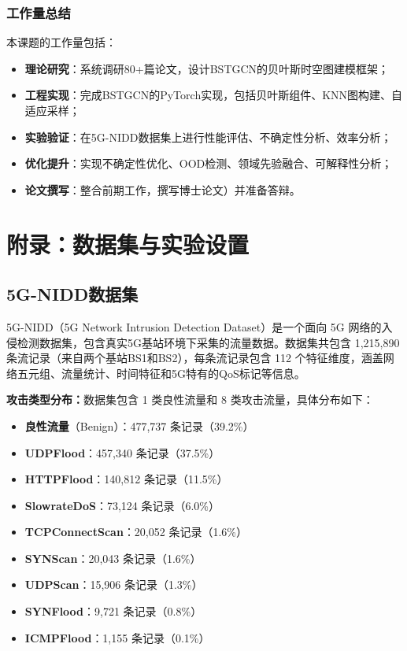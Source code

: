 \subsubsection{工作量总结}

本课题的工作量包括：

\begin{itemize}
  \item \textbf{理论研究}：系统调研80+篇论文，设计BSTGCN的贝叶斯时空图建模框架；
  \item \textbf{工程实现}：完成BSTGCN的PyTorch实现，包括贝叶斯组件、KNN图构建、自适应采样；
  \item \textbf{实验验证}：在5G-NIDD数据集上进行性能评估、不确定性分析、效率分析；
  \item \textbf{优化提升}：实现不确定性优化、OOD检测、领域先验融合、可解释性分析；
  \item \textbf{论文撰写}：整合前期工作，撰写博士论文）并准备答辩。
\end{itemize}


\section{附录：数据集与实验设置}

\subsection{5G-NIDD数据集}

5G-NIDD（5G Network Intrusion Detection Dataset）是一个面向 5G 网络的入侵检测数据集，包含真实5G基站环境下采集的流量数据。数据集共包含 1,215,890 条流记录（来自两个基站BS1和BS2），每条流记录包含 112 个特征维度，涵盖网络五元组、流量统计、时间特征和5G特有的QoS标记等信息。

\textbf{攻击类型分布：}数据集包含 1 类良性流量和 8 类攻击流量，具体分布如下：

\begin{itemize}
  \item \textbf{良性流量}（Benign）：477,737 条记录（39.2\%）
  \item \textbf{UDPFlood}：457,340 条记录（37.5\%）
  \item \textbf{HTTPFlood}：140,812 条记录（11.5\%）
  \item \textbf{SlowrateDoS}：73,124 条记录（6.0\%）
  \item \textbf{TCPConnectScan}：20,052 条记录（1.6\%）
  \item \textbf{SYNScan}：20,043 条记录（1.6\%）
  \item \textbf{UDPScan}：15,906 条记录（1.3\%）
  \item \textbf{SYNFlood}：9,721 条记录（0.8\%）
  \item \textbf{ICMPFlood}：1,155 条记录（0.1\%）
\end{itemize}

